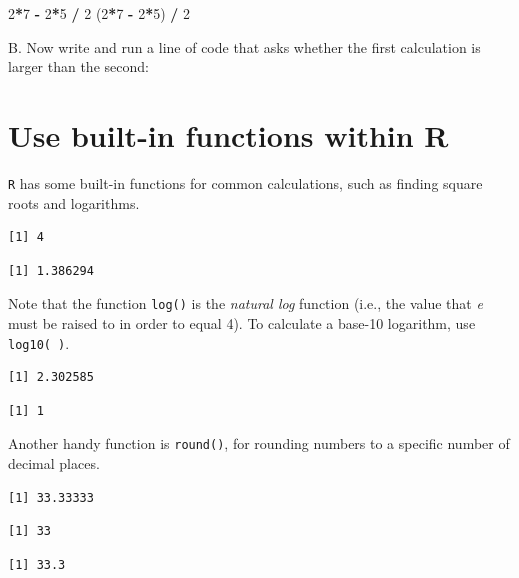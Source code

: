\documentclass[
]{book}
\newenvironment{Shaded}{\begin{snugshade}}{\end{snugshade}}
\newcommand{\DecValTok}[1]{\textcolor[rgb]{0.00,0.00,0.81}{#1}}
\newcommand{\NormalTok}[1]{#1}
\newcommand{\OperatorTok}[1]{\textcolor[rgb]{0.81,0.36,0.00}{\textbf{#1}}}
\newcommand{\StringTok}[1]{\textcolor[rgb]{0.31,0.60,0.02}{#1}}
\begin{document}
\begin{Shaded}
\begin{Highlighting}[]
\DecValTok{2}\OperatorTok{*}\DecValTok{7} \OperatorTok{-}\StringTok{ }\DecValTok{2}\OperatorTok{*}\DecValTok{5} \OperatorTok{/}\StringTok{ }\DecValTok{2}
\NormalTok{(}\DecValTok{2}\OperatorTok{*}\DecValTok{7} \OperatorTok{-}\StringTok{ }\DecValTok{2}\OperatorTok{*}\DecValTok{5}\NormalTok{) }\OperatorTok{/}\StringTok{ }\DecValTok{2}
\end{Highlighting}
\end{Shaded}

B. Now write and run a line of code that asks whether the first calculation is larger than the second:

\hypertarget{use-built-in-functions-within-r}{%
\section{Use built-in functions within R}\label{use-built-in-functions-within-r}}

\texttt{R} has some built-in functions for common calculations, such as finding square roots and logarithms.

\begin{verbatim}
[1] 4
\end{verbatim}

\begin{verbatim}
[1] 1.386294
\end{verbatim}

Note that the function \texttt{log()} is the \emph{natural log} function (i.e., the value that \emph{e} must be raised to in order to equal 4). To calculate a base-10 logarithm, use \texttt{log10(\ )}.

\begin{verbatim}
[1] 2.302585
\end{verbatim}

\begin{verbatim}
[1] 1
\end{verbatim}

Another handy function is \texttt{round()}, for rounding numbers to a specific number of decimal places.

\begin{verbatim}
[1] 33.33333
\end{verbatim}

\begin{verbatim}
[1] 33
\end{verbatim}

\begin{verbatim}
[1] 33.3
\end{verbatim}
\end{document}
